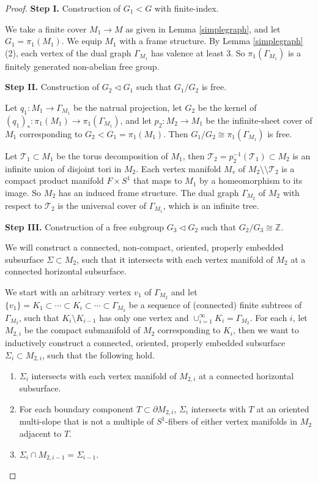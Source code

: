 \documentclass{amsart}
\numberwithin{equation}{section}
\theoremstyle{definition}
\begin{document}
\begin{proof}
{\bf Step I. } Construction of $G_1<G$ with finite-index. 

We take a finite cover $M_1\to M$ as given in Lemma \ref{simplegraph}, and let $G_1=\pi_1(M_1)$. We equip $M_1$ with a frame structure. By Lemma \ref{simplegraph} (2), each vertex of the dual graph $\Gamma_{M_1}$ has valence at least $3$. So $\pi_1(\Gamma_{M_1})$ is a finitely generated non-abelian free group. 

{\bf Step II.} Construction of $G_2\vartriangleleft G_1$ such that $G_1/G_2$ is free. 

Let $q_1:M_1\to \Gamma_{M_1}$ be the natrual projection, let $G_2$ be the kernel of $(q_1)_*:\pi_1(M_1)\to \pi_1(\Gamma_{M_1})$, and let $p_2:M_2\to M_1$ be the infinite-sheet cover of $M_1$ corresponding to $G_2<G_1=\pi_1(M_1)$. Then $G_1/G_2\cong \pi_1(\Gamma_{M_1})$ is free.

Let $\mathcal{T}_1\subset M_1$ be the torus decomposition of $M_1$, then $\mathcal{T}_2=p_2^{-1}(\mathcal{T}_1)\subset M_2$ is an infinite union of disjoint tori in $M_2$. Each vertex manifold $M_v$ of $M_2\setminus\setminus \mathcal{T}_2$ is a compact product manifold $F\times S^1$ that maps to $M_1$ by a homeomorphism to its image. So $M_2$ has an induced frame structure. The dual graph $\Gamma_{M_2}$ of $M_2$ with respect to $\mathcal{T}_2$ is the universal cover of $\Gamma_{M_1}$, which is an infinite tree.

{\bf Step III.} Construction of a free subgroup $G_3\vartriangleleft G_2$ such that $G_2/G_3\cong \mathbb{Z}$.

We will construct a connected, non-compact, oriented, properly embedded subsurface $\Sigma\subset M_2$, such that it intersects with each vertex manifold of $M_2$ at a connected horizontal subsurface. 

We start with an arbitrary vertex $v_1$ of $\Gamma_{M_2}$ and let $\{v_1\}=K_1\subset \cdots \subset K_i\subset \cdots \subset \Gamma_{M_2}$ be a sequence of (connected) finite subtrees of $\Gamma_{M_2}$, such that $K_i\setminus K_{i-1}$ has only one vertex and $\cup_{i=1}^{\infty}K_i=\Gamma_{M_2}$. For each $i$, let $M_{2,i}$ be the compact submanifold of $M_2$ corresponding to $K_i$, then we want to inductively construct a connected, oriented, properly embedded subsurface $\Sigma_i\subset M_{2,i}$, such that the following hold.
\begin{enumerate}
\item[(i)] $\Sigma_i$ intersects with each vertex manifold of $M_{2,i}$ at a connected horizontal subsurface.
\item[(ii)] For each boundary component $T\subset \partial M_{2,i}$, $\Sigma_i$ intersects with $T$ at an oriented multi-slope that is not a multiple of $S^1$-fibers of either vertex manifolds in $M_2$ adjacent to $T$.
\item[(iii)] $\Sigma_i\cap M_{2,i-1}=\Sigma_{i-1}$.
\end{enumerate} 


\end{proof}
\end{document}

